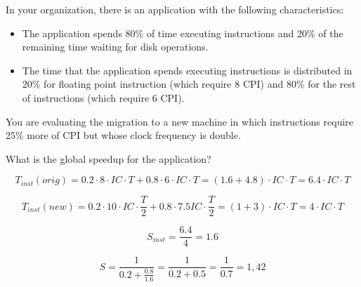 \begin{acexercise}\end{acexercise}

In your organization, there is an application with the following characteristics:

\begin{itemize}

\item The application spends 80\% of time executing instructions and 20\% of the remaining time
waiting for disk operations.

\item The time that the application spends executing instructions is distributed
in 20\% for floating point instruction (which require 8 CPI)
and 80\% for the rest of instructions (which require 6 CPI).

\end{itemize}

You are evaluating the migration to a new machine in which instructions
require 25\% more of CPI but whose clock frequency is double.

What is the global speedup for the application?


\begin{acsolution}\end{acsolution}

\[ 
T_{inst}(orig) = 
0.2 \cdot 8 \cdot IC \cdot T+ 0.8 \cdot 6 \cdot IC \cdot T = 
(1.6 + 4.8) \cdot IC \cdot T = 
6.4 \cdot IC \cdot T 
\]

\[ 
T_{inst}(new) = 
0.2 \cdot 10 \cdot IC \cdot \frac{T}{2} + 0.8 \cdot 7.5 IC \cdot \frac{T}{2} = 
(1 + 3) \cdot IC \cdot T = 
4 \cdot IC \cdot T 
\]

\[ 
S_{inst} = 
\frac{6.4}{4} = 
1.6 
\]

\[ 
S = 
\frac{1}{0.2 + \frac{0.8}{1.6}} = 
\frac{1}{0.2 + 0.5} = 
\frac{1}{0.7} =1,42 
\]

